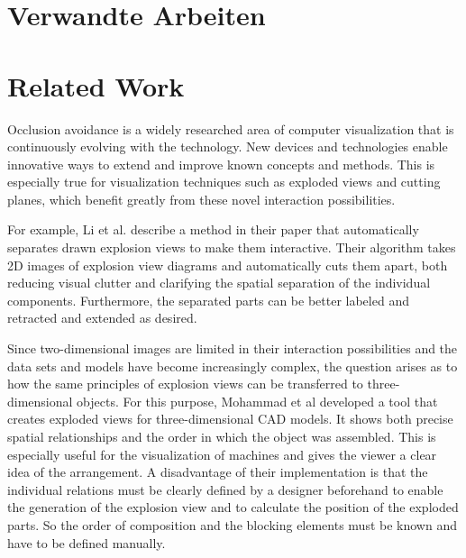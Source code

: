 {\chapter{Verwandte Arbeiten}}
{\chapter{Related Work}}
\label{sec:related}




Occlusion avoidance is a widely researched area of computer visualization that is continuously evolving with the technology. 
New devices and technologies enable innovative ways to extend and improve known concepts and methods. 
This is especially true for visualization techniques such as exploded views and cutting planes, which benefit greatly from these novel interaction possibilities.
 
For example, Li et al. describe a method in their paper that automatically separates drawn explosion views to make them interactive. %
Their algorithm takes 2D images of explosion view diagrams and automatically cuts them apart, both reducing visual clutter and clarifying the spatial separation of the individual components. %
Furthermore, the separated parts can be better labeled and retracted and extended as desired.

Since two-dimensional images are limited in their interaction possibilities and the data sets and models have become increasingly complex, the question arises as to how the same principles of explosion views can be transferred to three-dimensional objects.
For this purpose, Mohammad et al developed a tool that creates exploded views for three-dimensional CAD models. It shows both precise spatial relationships and the order in which the object was assembled. %
This is especially useful for the visualization of machines and gives the viewer a clear idea of the arrangement. 
A disadvantage of their implementation is that the individual relations must be clearly defined by a designer beforehand to enable the generation of the explosion view and to calculate the position of the exploded parts.
So the order of composition and the blocking elements must be known and have to be defined manually. 

